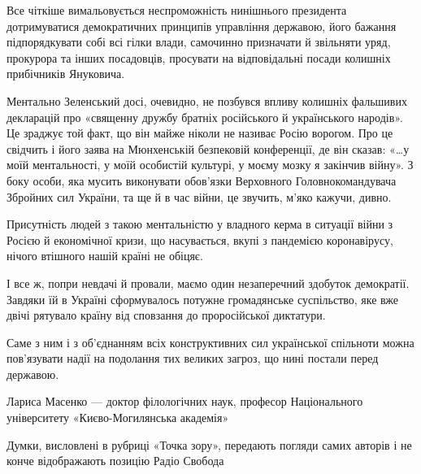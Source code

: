 Все чіткіше вимальовується неспроможність нинішнього президента дотримуватися
демократичних принципів управління державою, його бажання підпорядкувати собі
всі гілки влади, самочинно призначати й звільняти уряд, прокурора та інших
посадовців, просувати на відповідальні посади колишніх прибічників Януковича.

Ментально Зеленський досі, очевидно, не позбувся впливу колишніх фальшивих
декларацій про «священну дружбу братніх російського й українського народів». Це
зраджує той факт, що він майже ніколи не називає Росію ворогом. Про це свідчить
і його заява на Мюнхенській безпековій конференції, де він сказав: «…у моїй
ментальності, у моїй особистій культурі, у моєму мозку я закінчив війну». З
боку особи, яка мусить виконувати обов’язки Верховного Головнокомандувача
Збройних сил України, та ще й в час війни, це звучить, м’яко кажучи, дивно.

Присутність людей з такою ментальністю у владного керма в ситуації війни з
Росією й економічної кризи, що насувається, вкупі з пандемією коронавірусу,
нічого втішного нашій країні не обіцяє.

І все ж, попри невдачі й провали, маємо один незаперечний здобуток демократії.
Завдяки їй в Україні сформувалось потужне громадянське суспільство, яке вже
двічі рятувало країну від сповзання до проросійської диктатури.

Саме з ним і з об’єднанням всіх конструктивних сил української спільноти можна
пов’язувати надії на подолання тих великих загроз, що нині постали перед
державою.

Лариса Масенко --- доктор філологічних наук, професор Національного університету
«Києво-Могилянська академія»

Думки, висловлені в рубриці «Точка зору», передають погляди самих авторів і не
конче відображають позицію Радіо Свобода



